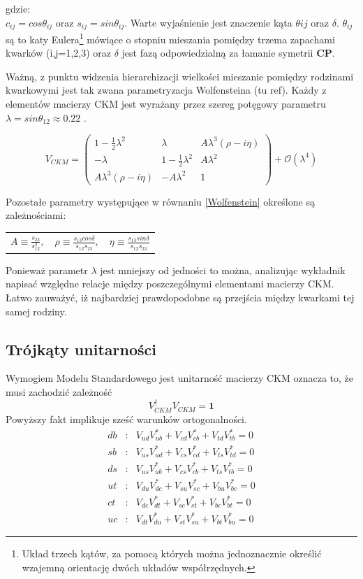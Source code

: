 gdzie:\\
$c_{ij}=cos\theta_{ij}$ oraz $s_{ij}=sin\theta_{ij}$. Warte wyjaśnienie jest znaczenie kąta $\theta{ij}$ oraz $\delta$. $\theta_{ij}$ są to katy Eulera\footnote{Układ trzech kątów, za pomocą których można jednoznacznie określić wzajemną orientację dwóch układów współrzędnych.} mówiące o stopniu mieszania pomiędzy trzema zapachami kwarków (i,j=1,2,3) oraz $\delta$ jest fazą odpowiedzialną za łamanie symetrii \textbf{CP}.

Ważną, z punktu widzenia hierarchizacji wielkości mieszanie pomiędzy rodzinami kwarkowymi jest tak zwana parametryzacja Wolfensteina (tu ref). Każdy z elementów macierzy CKM jest wyrażany przez szereg potęgowy parametru $\lambda=sin\theta_{12}\approx 0.22$ .

\begin{equation}
V_{CKM}=\begin{pmatrix}
1-\frac{1}{2}\lambda^2& \lambda & A\lambda^3(\rho-i\eta)\\
-\lambda & 1-\frac{1}{2}\lambda^2 & A\lambda^2\\
 A\lambda^3(\rho-i\eta) & -A\lambda^2 & 1
\end{pmatrix} +\mathcal{O}(\lambda^4) 
\label{Wolfenstein}
\end{equation}

Pozostałe parametry występujące w równaniu \ref{Wolfenstein} określone są zależnościami:
\begin{center}
\begin{tabular}{l c r}
$A \equiv \frac{s_{23}}{s^2_{12}},$&  $\rho \equiv  \frac{s_{13}cos\delta}{s_{12}s_{23}},$ & $\eta  \equiv \frac{s_{13}sin\delta}{s_{12}s_{23}}$
\end{tabular}
\end{center}

Ponieważ parametr $\lambda$ jest mniejszy od jedności to można, analizując wykładnik napisać względne relacje między poszczególnymi elementami macierzy CKM. Łatwo zauważyć, iż najbardziej prawdopodobne są przejścia między kwarkami tej samej rodziny.
\subsection{Trójkąty unitarności}

Wymogiem Modelu Standardowego jest unitarność macierzy CKM oznacza to, że musi zachodzić zależność
\begin{equation}
V^{\dagger}_{CKM}V_{CKM}=\mathbf{1}
\end{equation}
Powyższy fakt implikuje sześć warunków ortogonalności.
\begin{eqnarray}
db&:&V_{ud}V^*_{ub}+V_{cd}V^*_{cb}+V_{td}V^*_{tb}=0  \\
sb&:&V_{us}V^*_{ud}+V_{cs}V^*_{cd}+V_{ts}V^*_{td}=0  \\
ds&:&V_{us}V^*_{ub}+V_{cs}V^*_{cb}+V_{ts}V^*_{tb}=0  \\
ut&:&V_{du}V^*_{dc}+V_{su}V^*_{sc}+V_{bu}V^*_{bc}=0  \\
ct&:&V_{dc}V^*_{dt}+V_{sc}V^*_{st}+V_{bc}V^*_{bt}=0  \\
uc&:&V_{dt}V^*_{du}+V_{st}V^*_{su}+V_{bt}V^*_{bu}=0  
\end{eqnarray}


